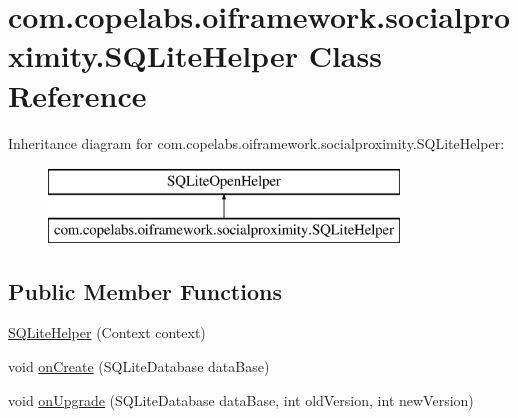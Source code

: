 \hypertarget{classcom_1_1copelabs_1_1oiframework_1_1socialproximity_1_1_s_q_lite_helper}{}\section{com.\+copelabs.\+oiframework.\+socialproximity.\+S\+Q\+Lite\+Helper Class Reference}
\label{classcom_1_1copelabs_1_1oiframework_1_1socialproximity_1_1_s_q_lite_helper}
Inheritance diagram for com.\+copelabs.\+oiframework.\+socialproximity.\+S\+Q\+Lite\+Helper\+:\begin{figure}[H]
\begin{center}
\leavevmode
\includegraphics[height=2.000000cm]{classcom_1_1copelabs_1_1oiframework_1_1socialproximity_1_1_s_q_lite_helper}
\end{center}
\end{figure}
\subsection*{Public Member Functions}
\begin{DoxyCompactItemize}
\item 
\hyperlink{classcom_1_1copelabs_1_1oiframework_1_1socialproximity_1_1_s_q_lite_helper_a5d8b03643c0e686cc8450eca42114091}{S\+Q\+Lite\+Helper} (Context context)
\item 
void \hyperlink{classcom_1_1copelabs_1_1oiframework_1_1socialproximity_1_1_s_q_lite_helper_a6352e58e02fcfc927bf783e2e5b6d405}{on\+Create} (S\+Q\+Lite\+Database data\+Base)
\item 
void \hyperlink{classcom_1_1copelabs_1_1oiframework_1_1socialproximity_1_1_s_q_lite_helper_af98ddb015b61218a9cfe64c5e76b8868}{on\+Upgrade} (S\+Q\+Lite\+Database data\+Base, int old\+Version, int new\+Version)
\end{DoxyCompactItemize}
